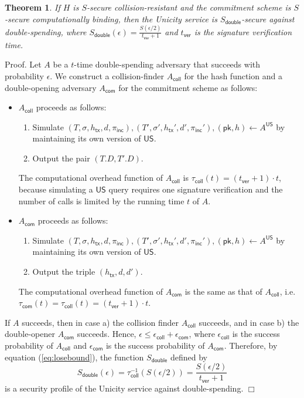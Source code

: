 \documentclass{article}
\newtheorem{theorem}{Theorem}[section]
\newenvironment{proof}{\textsf{Proof}.}{\hfill$\Box$}
\newcommand{\pubkey}[0]{\mathsf{pk}}
\newcommand{\unisrv}[0]{\mathsf{US}}
\newcommand{\txhash}[0]{h_\mathsf{tx}}
\newcommand{\pinc}[0]{\pi_{\mathsf{inc}}}
\begin{document}
\begin{theorem}
If $H$ is $S$-secure collision-resistant and the commitment scheme is $S$-secure computationally binding, then the Unicity service is $S_\mathsf{double}$-secure against double-spending, where
$S_\mathsf{double}(\epsilon) = \frac{S(\epsilon/2)}{t_\mathsf{ver}+1}$
and $t_\mathsf{ver}$ is the signature verification time.
\end{theorem}
\begin{proof}
Let $A$ be a $t$-time double-spending adversary that succeeds with probability $\epsilon$. We construct a collision-finder $A_\mathsf{coll}$ for the hash function and a double-opening adversary $A_\mathsf{com}$ for the commitment scheme as follows:
\begin{itemize}
\item $A_\mathsf{coll}$ proceeds as follows:
\begin{enumerate}
\item Simulate $(T,\sigma,\txhash,d,\pinc),(T',\sigma',\txhash',d',\pinc'),(\pubkey,h)\gets A^\unisrv$ by maintaining its own version of $\unisrv$.
\item Output the pair $(T.D,T'.D)$.
\end{enumerate}
The computational overhead function of $A_\mathsf{coll}$ is $\tau_\mathsf{coll}(t) = (t_\mathsf{ver}+1) \cdot t$, because simulating a $\unisrv$ query requires one signature verification and the number of calls is limited by the running time $t$ of $A$.
\item $A_\mathsf{com}$ proceeds as follows:
\begin{enumerate}
\item Simulate $(T,\sigma,\txhash,d,\pinc),(T',\sigma',\txhash',d',\pinc'),(\pubkey,h)\gets A^\unisrv$ by maintaining its own version of $\unisrv$.
\item Output the triple $(\txhash,d,d')$.
\end{enumerate}
The computational overhead function of $A_\mathsf{com}$ is the same as
that of $A_\mathsf{coll}$, i.e. $\tau_\mathsf{com}(t)= \tau_\mathsf{coll}(t)=(t_\mathsf{ver}+1) \cdot t$.
\end{itemize}
 If $A$ succeeds, then in case a) the collision finder $A_\mathsf{coll}$ succeeds, and in case b) the double-opener $A_\mathsf{com}$ succeeds. Hence, $\epsilon \le \epsilon_\mathsf{coll} + \epsilon_\mathsf{com}$, where $\epsilon_\mathsf{coll}$ is the success probability of $A_\mathsf{coll}$ and
$\epsilon_\mathsf{com}$ is the success probability of $A_\mathsf{com}$.
Therefore, by equation (\ref{eq:losebound}), the function $S_\mathsf{double}$ defined by
\[
S_\mathsf{double}(\epsilon) = \tau^{-1}_\mathsf{coll}(S(\epsilon/2)) =
\frac{S(\epsilon/2)}{t_\mathsf{ver}+1}
\]
is a security profile of the Unicity service against double-spending.
\end{proof}
\end{document}
